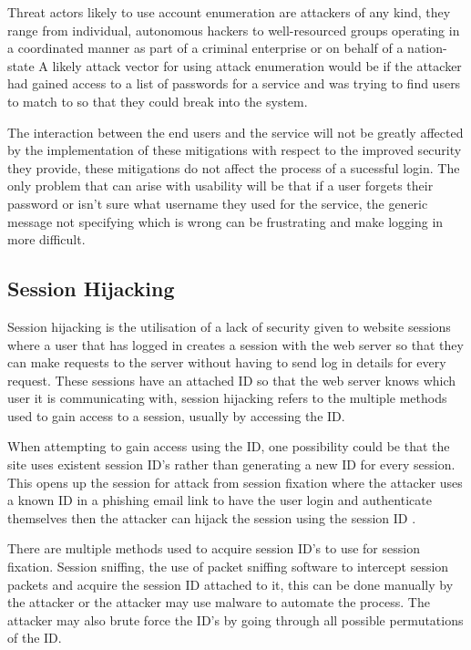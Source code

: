 \documentclass{ueacmpstyle}
\begin{document}
      Threat actors likely to use account enumeration are attackers of any kind, they range 
      from individual, autonomous hackers to well-resourced groups operating in a coordinated 
      manner as part of a criminal enterprise or on behalf of a nation-state \citep{NISTGuideToCyber}
      A likely attack vector for using attack enumeration would be if the attacker had 
      gained access to a list of passwords for a service and was trying to find users to 
      match to so that they could break into the system.

      The interaction between the end users and the service will not be greatly affected 
      by the implementation of these mitigations with respect to the improved security 
      they provide, these mitigations do not affect the process of a sucessful login. 
      The only problem that can arise with usability will be that if a user forgets their 
      password or isn't sure what username they used for the service, the generic message 
      not specifying which is wrong can be frustrating and make logging in more difficult. 

      \subsection{Session Hijacking}\label{sub:SessHijk}
      Session hijacking is the utilisation of a lack of security given to website sessions 
      where a user that has logged in creates a session with the web server so that they 
      can make requests to the server without having to send log in details for every 
      request. These sessions have an attached ID so that the web server knows which user 
      it is communicating with, session hijacking refers to the multiple methods used to 
      gain access to a session, usually by accessing the ID. 

      When attempting to gain access using the ID, one possibility could be that the site 
      uses existent session ID's rather than generating a new ID for every session. This 
      opens up the session for attack from session fixation where the attacker uses a 
      known ID in a phishing email link to have the user login and authenticate themselves 
      then the attacker can hijack the session using the session ID \citep{OWASPSessionFixation}.

      There are multiple methods used to acquire session ID's to use for session fixation. 
      Session sniffing, the use of packet sniffing software to intercept session packets 
      and acquire the session ID attached to it, this can be done manually by the attacker 
      or the attacker may use malware to automate the process. The attacker may also brute 
      force the ID's by going through all possible permutations of the ID.
\end{document}
